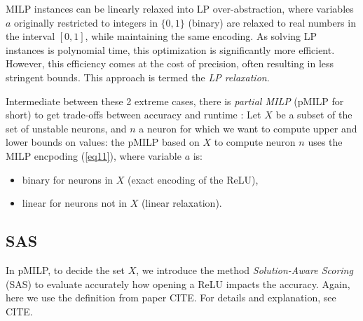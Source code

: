 	MILP instances can be linearly relaxed into LP over-abstraction, where variables $a$ originally restricted to integers in $\{0,1\}$ (binary) are relaxed to real numbers in the interval $[0,1]$, while maintaining the same encoding. As solving LP instances is polynomial time, this optimization is significantly more efficient. However, this efficiency comes at the cost of precision, often resulting in less stringent bounds. This approach is termed the {\em LP relaxation}.
	
	
	
	Intermediate between these 2 extreme cases, there is {\em partial MILP} 
    (pMILP for short) to get trade-offs between accuracy and runtime
	\cite{DivideAndSlide}:
	Let $X$ be a subset of the set of unstable neurons, and $n$ a neuron for which we want to compute upper and lower bounds on values: the pMILP based on $X$ to compute neuron $n$ uses the MILP encpoding (\ref{eq11}), where variable $a$ is:
	\begin{itemize}
		\item binary for neurons in $X$ (exact encoding of the ReLU),
		\item linear for neurons not in $X$ (linear relaxation).
	\end{itemize}
	
	
	
	\iffalse
	\subsection{SAS}
	
	
	In pMILP, to decide the set $X$, we introduce the method {\em Solution-Aware Scoring} (SAS)
	to evaluate accurately how opening a ReLU impacts the accuracy. Again, here we use the definition from paper CITE. For details and explanation, see CITE.
	

